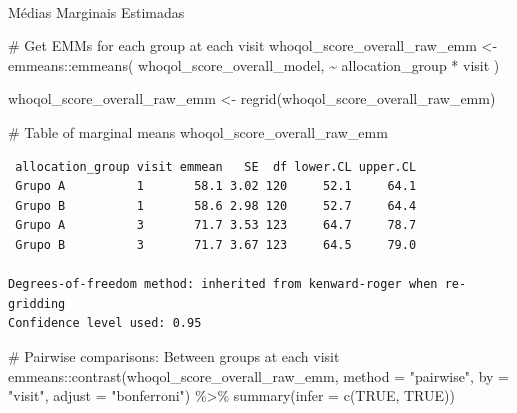 \documentclass[
  letterpaper,
  DIV=11,
  numbers=noendperiod]{scrartcl}
\makeatletter
\let\oldparagraph\paragraph
\renewcommand{\paragraph}{
    \@ifstar
      \xxxParagraphStar
      \xxxParagraphNoStar
  }
\newcommand{\xxxParagraphStar}[1]{\oldparagraph*{#1}\mbox{}}
\newcommand{\xxxParagraphNoStar}[1]{\oldparagraph{#1}\mbox{}}
\newenvironment{Shaded}{\begin{snugshade}}{\end{snugshade}}
\newcommand{\AttributeTok}[1]{\textcolor[rgb]{0.40,0.45,0.13}{#1}}
\newcommand{\CommentTok}[1]{\textcolor[rgb]{0.37,0.37,0.37}{#1}}
\newcommand{\ConstantTok}[1]{\textcolor[rgb]{0.56,0.35,0.01}{#1}}
\newcommand{\FunctionTok}[1]{\textcolor[rgb]{0.28,0.35,0.67}{#1}}
\newcommand{\NormalTok}[1]{\textcolor[rgb]{0.00,0.23,0.31}{#1}}
\newcommand{\OtherTok}[1]{\textcolor[rgb]{0.00,0.23,0.31}{#1}}
\newcommand{\SpecialCharTok}[1]{\textcolor[rgb]{0.37,0.37,0.37}{#1}}
\newcommand{\StringTok}[1]{\textcolor[rgb]{0.13,0.47,0.30}{#1}}
\makeatother
\begin{document}
\paragraph{Médias Marginais
Estimadas}\label{muxe9dias-marginais-estimadas-21}

\begin{Shaded}
\begin{Highlighting}[]
\CommentTok{\# Get EMMs for each group at each visit}
\NormalTok{whoqol\_score\_overall\_raw\_emm }\OtherTok{\textless{}{-}}\NormalTok{ emmeans}\SpecialCharTok{::}\FunctionTok{emmeans}\NormalTok{(}
\NormalTok{    whoqol\_score\_overall\_model, }
    \SpecialCharTok{\textasciitilde{}}\NormalTok{ allocation\_group }\SpecialCharTok{*}\NormalTok{ visit}
\NormalTok{)}

\NormalTok{whoqol\_score\_overall\_raw\_emm }\OtherTok{\textless{}{-}} \FunctionTok{regrid}\NormalTok{(whoqol\_score\_overall\_raw\_emm)}

\CommentTok{\# Table of marginal means}
\NormalTok{whoqol\_score\_overall\_raw\_emm}
\end{Highlighting}
\end{Shaded}

\begin{verbatim}
 allocation_group visit emmean   SE  df lower.CL upper.CL
 Grupo A          1       58.1 3.02 120     52.1     64.1
 Grupo B          1       58.6 2.98 120     52.7     64.4
 Grupo A          3       71.7 3.53 123     64.7     78.7
 Grupo B          3       71.7 3.67 123     64.5     79.0

Degrees-of-freedom method: inherited from kenward-roger when re-gridding 
Confidence level used: 0.95 
\end{verbatim}

\begin{Shaded}
\begin{Highlighting}[]
\CommentTok{\# Pairwise comparisons: Between groups at each visit}
\NormalTok{emmeans}\SpecialCharTok{::}\FunctionTok{contrast}\NormalTok{(whoqol\_score\_overall\_raw\_emm, }\AttributeTok{method =} \StringTok{"pairwise"}\NormalTok{, }\AttributeTok{by =} \StringTok{"visit"}\NormalTok{, }\AttributeTok{adjust =} \StringTok{"bonferroni"}\NormalTok{) }\SpecialCharTok{\%\textgreater{}\%} \FunctionTok{summary}\NormalTok{(}\AttributeTok{infer =} \FunctionTok{c}\NormalTok{(}\ConstantTok{TRUE}\NormalTok{, }\ConstantTok{TRUE}\NormalTok{))}
\end{Highlighting}
\end{Shaded}
\end{document}
